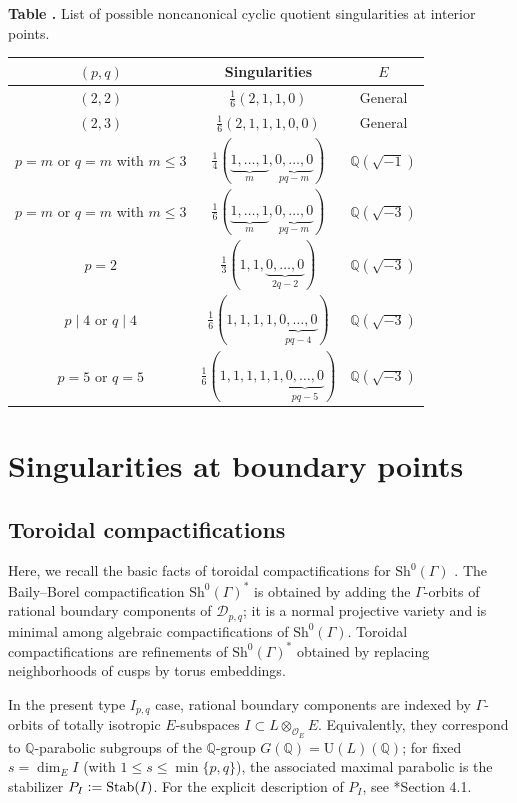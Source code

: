 \documentclass[11pt]{amsart}
\theoremstyle{plain}
\theoremstyle{definition}
\numberwithin{equation}{section}
\def\Q{{\mathbb Q}}
\def\dim{\mathop{\mathrm{dim}}\nolimits}
\def\Stab{\mathop{\mathrm{Stab}}\nolimits}
\def\OO{\mathscr{O}}
\def\U{\mathrm{U}}
\newcommand{\bbQ}{\mathbb{Q}}
\newcommand{\defeq}{\vcentcolon=}
\begin{document}
\renewcommand{\arraystretch}{1.2}
\begin{center}
\label{list_noncanonical_sing}
\textbf{Table \thetable.} List of possible noncanonical cyclic quotient singularities at interior points.
\par\smallskip
\begin{tabular}{c|c|c}
    $(p,q)$ & Singularities & $E$ \\
    \hline
    $(2,2)$ & $\frac{1}{6}(2,1,1,0)$ & General \\
    $(2,3)$ & $\frac{1}{6}(2,1,1,1,0,0)$ & General \\
    $p=m$ or $q=m$ with $m\leq3$ & $\frac{1}{4}(\underbrace{1,\ldots,1}_m,\underbrace{0,\ldots,0}_{pq-m})$ & $\bbQ(\sqrt{-1})$ \\
    $p=m$ or $q=m$ with $m\leq3$ & $\frac{1}{6}(\underbrace{1,\ldots,1}_m,\underbrace{0,\ldots,0}_{pq-m})$ & $\bbQ(\sqrt{-3})$\\
    $p=2$
& $\frac{1}{3}(1,1,\underbrace{0,\ldots,0}_{2q-2})$
& $\bbQ(\sqrt{-3})$\\
$p\mid4$ or $q\mid4$
& $\frac{1}{6}(1,1,1,1,\underbrace{0,\ldots,0}_{pq-4})$
& $\bbQ(\sqrt{-3})$\\
$p=5$ or $q=5$
& $\frac{1}{6}(1,1,1,1,1,\underbrace{0,\ldots,0}_{pq-5})$
& $\bbQ(\sqrt{-3})$
\end{tabular}
\end{center}

\section{Singularities at boundary points}\label{sec:boundary-singularities}
\subsection{Toroidal compactifications}
Here, we recall the basic facts of toroidal compactifications for $\mathrm{Sh}^0(\Gamma)$ \cites{ash2010smooth,kasparian2021toroidal}.
The Baily--Borel compactification $\mathrm{Sh}^0(\Gamma)^*$ is obtained by adding the
$\Gamma$-orbits of rational boundary components of $\mathcal{D}_{p,q}$; it is a normal projective
variety and is minimal among algebraic compactifications of $\mathrm{Sh}^0(\Gamma)$.
Toroidal compactifications are refinements of $\mathrm{Sh}^0(\Gamma)^*$ obtained by replacing neighborhoods of cusps by torus embeddings.

In the present type $I_{p,q}$ case, rational boundary components are indexed by $\Gamma$-orbits
of totally isotropic $E$-subspaces $I\subset L\otimes_{\OO_E}E$.
Equivalently, they correspond to $\bbQ$-parabolic subgroups of the $\bbQ$-group
$G(\Q) = \U(L)(\Q)$; 
for fixed $s=\dim_E I$ (with $1\le s\le \min\{p,q\}$),
the associated maximal parabolic is the stabilizer $P_I\defeq\Stab(I)$.
For the explicit description of $P_I$, see
\cite{kasparian2021toroidal}*{Section 4.1}.
\end{document}

